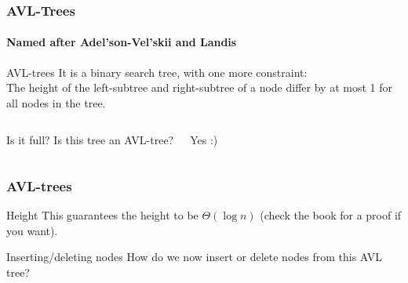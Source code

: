 \begin{frame}
	\frametitle{AVL-Trees}
	\framesubtitle{Named after Adel'son-Vel'skii and Landis}

		\begin{block}{AVL-trees}
			It is a binary search tree, with one more constraint:\\
			The height of the left-subtree and right-subtree of a node differ by at most 1 for all nodes in the tree.
		\end{block}	

	\begin{columns}


		\begin{block}{Is it full?}
			Is this tree an AVL-tree?
		\end{block}
		\pause
		\begin{block}{}
			Yes :)	
		\end{block}
	\end{columns}
\end{frame}

\begin{frame}
	\frametitle{AVL-trees}
	\begin{block}{Height}
		This guarantees the height to be $\Theta(\log n)$ (check the book for a proof if you want).
	\end{block}

	\pause
	\begin{block}{Inserting/deleting nodes}
		How do we now insert or delete nodes from this AVL tree?
	\end{block}
\end{frame}

